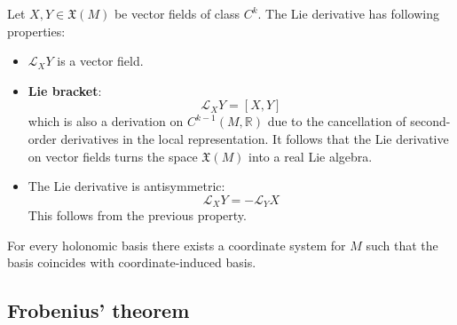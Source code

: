 	\begin{property}
		Let $X, Y\in\mathfrak{X}(M)$ be vector fields of class $C^k$. The Lie derivative has following properties:
		\begin{itemize}
			\item $\mathcal{L}_XY$ is a vector field.
			\item \textbf{Lie bracket}:
				\begin{equation}
					\label{manifolds:lie_bracket}
					\mathcal{L}_XY = [X, Y]
				\end{equation}
				which is also a derivation on $C^{k-1}(M, \mathbb{R})$ due to the cancellation of second-order derivatives in the local representation. It follows that the Lie derivative on vector fields turns the space $\mathfrak{X}(M)$ into a real Lie algebra.
			\item The Lie derivative is antisymmetric:
				\begin{equation}
					\label{diff:lie_derivative_antisymmetry}
					\mathcal{L}_XY = -\mathcal{L}_YX
				\end{equation}
				This follows from the previous property.
		\end{itemize}
	\end{property}
	
	\begin{property}
		For every holonomic basis there exists a coordinate system for $M$ such that the basis coincides with coordinate-induced basis.
	\end{property}

\subsection{Frobenius' theorem}
	
